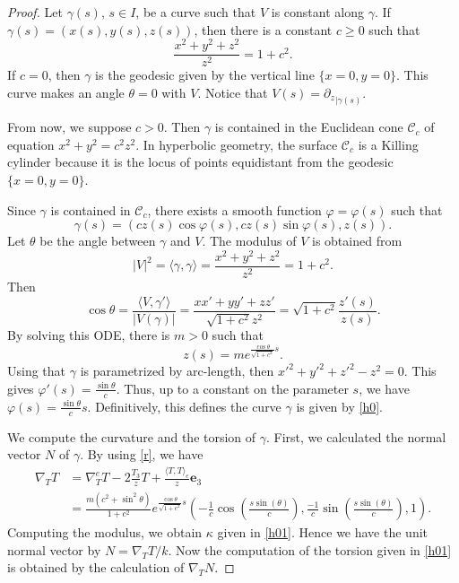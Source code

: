 \documentclass[10pt,a4paper]{amsart}
\def\e{\mathbf e}
\begin{document}
  \begin{proof}
    Let $\gamma(s)$, $s\in I$, be a curve such that $V$ is constant along $\gamma$. If $\gamma(s)=(x(s),y(s),z(s))$, then there is a constant $c\geq 0$  such that 
  $$\frac{x^2+y^2+z^2}{z^2}=1+c^2.$$
  If $c=0$, then $\gamma$ is the geodesic given by the vertical line $\{x=0,y=0\}$. This curve makes an angle $\theta=0$ with $V$. Notice that $V(s)={\partial_z}_{|\gamma(s)}$.
  
  From now, we suppose $c>0$. Then  $\gamma$ is contained in the Euclidean  cone $\mathcal{C}_c$ of equation $x^2+y^2=c^2 z^2$. In hyperbolic geometry, the surface $\mathcal{C}_c$ is a Killing cylinder  because it is the locus of points equidistant from the geodesic $\{x=0,y=0\}$.
  
  Since $\gamma$ is contained in $\mathcal{C}_c$,   there exists a smooth function $\varphi=\varphi(s)$ such that 
 \begin{equation}\label{p1}
 \gamma(s)=(cz(s)\cos\varphi(s),cz(s)\sin\varphi(s),z(s)).
 \end{equation}
 Let $\theta$ be the angle between $\gamma$ and $V$. The modulus of $V$ is obtained from 
 $$|V|^2=\langle \gamma,\gamma\rangle=\frac{x^2+y^2+z^2}{z^2}=1+c^2.$$
 Then
 $$\cos\theta=\frac{\langle V,\gamma'\rangle}{|V(\gamma)|}=\frac{xx'+yy'+zz'}{\sqrt{1+c^2}z^2}=\sqrt{1+c^2}\frac{ z'(s)}{z(s)}.$$
 By solving this ODE,  there is $m>0$ such that
 $$z(s)=me^{\frac{\cos\theta}{\sqrt{1+c^2}}s}.$$
 Using that $\gamma$ is parametrized by arc-length, then $x'^2+y'^2+z'^2-z^2=0$. This gives 
 $\varphi'(s)=\frac{\sin\theta}{c}$. Thus, up to a constant on the parameter $s$, we have  $\varphi(s)=\frac{\sin\theta}{c}s$. Definitively, this defines the curve $\gamma$  is given by \eqref{h0}.
 
  We compute the curvature and the torsion of $\gamma$. First, we calculated the normal vector $N$ of $\gamma$. By using \eqref{r}, we have 
\begin{equation}\label{normal}
\begin{split}
\nabla_TT&=\nabla^e_TT-2\frac{T_3}{z}T+\frac{\langle T,T\rangle_e}{z}\e_3\\
&=\frac{m(c^2+\sin^2\theta)}{1+c^2}e^{\frac{\cos\theta}{\sqrt{1+c^2}}s}\left(-\frac{1 }{  c}\cos \left(\frac{s \sin (\theta )}{c}\right),\frac{ - 1}{ c}\sin \left(\frac{s \sin (\theta )}{c}\right) , 1 \right). 
\end{split}
\end{equation}
Computing the modulus, we obtain $\kappa$ given in \eqref{h01}. Hence we have  the unit normal vector by $N=\nabla_TT/k$. Now the computation of the torsion given in \eqref{h01} is obtained by the calculation of  $\nabla_TN$. 


\end{proof}
\end{document}

